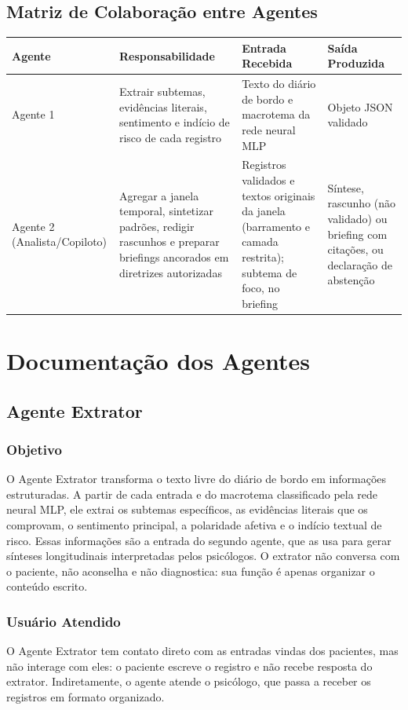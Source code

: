 \documentclass[12pt,a4paper]{article}
\newcommand{\cab}[1]{\textbf{#1}}
\begin{document}
\subsection{Matriz de Colaboração entre Agentes}
\begin{tabularx}{\textwidth}{|p{2.2cm}|Y|Y|Y|}
  \hline
  \cab{Agente} & \cab{Responsabilidade} & \cab{Entrada Recebida} & \cab{Saída Produzida} \\ \hline
  Agente 1 & Extrair subtemas, evidências literais, sentimento e indício de risco de cada registro & Texto do diário de bordo e macrotema da rede neural MLP & Objeto JSON validado \\ \hline
  Agente 2 (Analista/Copiloto) & Agregar a janela temporal, sintetizar padrões, redigir rascunhos e preparar briefings ancorados em diretrizes autorizadas & Registros validados e textos originais da janela (barramento e camada restrita); subtema de foco, no briefing & Síntese, rascunho (não validado) ou briefing com citações, ou declaração de abstenção \\ \hline
\end{tabularx}

\section{Documentação dos Agentes}

\subsection{Agente Extrator}

\subsubsection{Objetivo}
O Agente Extrator transforma o texto livre do diário de bordo em informações estruturadas.
A partir de cada entrada e do macrotema classificado pela rede neural MLP, ele extrai os
subtemas específicos, as evidências literais que os comprovam, o sentimento principal, a
polaridade afetiva e o indício textual de risco. Essas informações são a entrada do segundo
agente, que as usa para gerar sínteses longitudinais interpretadas pelos psicólogos. O
extrator não conversa com o paciente, não aconselha e não diagnostica: sua função é apenas
organizar o conteúdo escrito.

\subsubsection{Usuário Atendido}
O Agente Extrator tem contato direto com as entradas vindas dos pacientes, mas não interage
com eles: o paciente escreve o registro e não recebe resposta do extrator. Indiretamente,
o agente atende o psicólogo, que passa a receber os registros em formato organizado.
\end{document}
